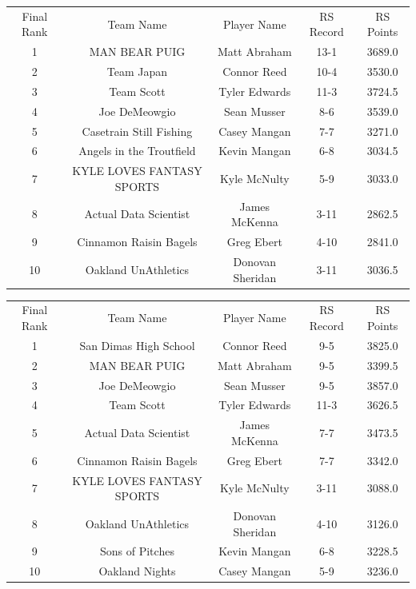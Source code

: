 \documentclass[11pt,letterpaper]{article}
\begin{document}
\newpage
{}
\vspace{-25pt}
\begin{table} [h]
\begin{center}
\begin{tabular} { c c c c c }
\\ Final Rank & Team Name & Player Name & RS Record & RS Points
\\ 1  & MAN BEAR PUIG  & Matt Abraham & 13-1 & 3689.0
\\ 2  & Team Japan & Connor Reed & 10-4 & 3530.0
\\ 3  & Team Scott & Tyler Edwards & 11-3 & 3724.5
\\ 4  & Joe DeMeowgio & Sean Musser & 8-6  & 3539.0
\\ 5  & Casetrain Still Fishing & Casey Mangan & 7-7 & 3271.0
\\ 6  & Angels in the Troutfield & Kevin Mangan & 6-8 & 3034.5
\\ 7  & KYLE LOVES FANTASY SPORTS & Kyle McNulty & 5-9 & 3033.0
\\ 8  & Actual Data Scientist & James McKenna & 3-11 & 2862.5
\\ 9  & Cinnamon Raisin Bagels & Greg Ebert & 4-10 & 2841.0
\\ 10  & Oakland UnAthletics  & Donovan Sheridan & 3-11  & 3036.5
\end{tabular}
\end{center}
\end{table}

\vspace{-25pt}
\begin{table} [h]
\begin{center}
\begin{tabular} { c c c c c }
\\ Final Rank & Team Name & Player Name & RS Record & RS Points
\\ 1  & San Dimas High School & Connor Reed & 9-5 & 3825.0
\\ 2  & MAN BEAR PUIG  & Matt Abraham & 9-5 & 3399.5
\\ 3  & Joe DeMeowgio & Sean Musser & 9-5  & 3857.0
\\ 4  & Team Scott & Tyler Edwards & 11-3 & 3626.5
\\ 5  & Actual Data Scientist & James McKenna & 7-7 & 3473.5
\\ 6  & Cinnamon Raisin Bagels & Greg Ebert & 7-7 & 3342.0
\\ 7  & KYLE LOVES FANTASY SPORTS & Kyle McNulty & 3-11 & 3088.0
\\ 8  & Oakland UnAthletics  & Donovan Sheridan & 4-10  & 3126.0
\\ 9  & Sons of Pitches & Kevin Mangan & 6-8 & 3228.5
\\ 10  & Oakland Nights & Casey Mangan & 5-9 & 3236.0



\end{tabular}
\end{center}
\end{table}
\end{document}
